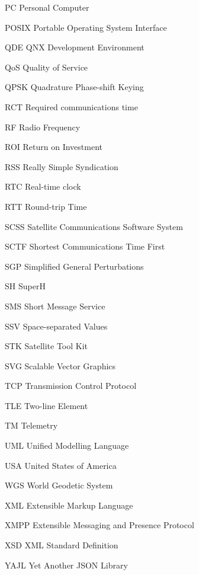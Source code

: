\begin{Nomencl}[\gnat]
		\item[PC]				Personal Computer
		\item[POSIX]			Portable Operating System Interface
		\item[QDE]			QNX Development Environment
		\item[QoS]				Quality of Service
		\item[QPSK]			Quadrature Phase-shift Keying
		\item[RCT]				Required communications time
		\item[RF]				Radio Frequency
		\item[ROI]				Return on Investment
		\item[RSS]			Really Simple Syndication
		\item[RTC]				Real-time clock
		\item[RTT]				Round-trip Time
		\item[SCSS]			Satellite Communications Software System
		\item[SCTF]			Shortest Communications Time First
		\item[SGP]			Simplified General Perturbations
		\item[SH]				SuperH
		\item[SMS]			Short Message Service
		\item[SSV]			Space-separated Values
		\item[STK]				Satellite Tool Kit
		\item[SVG]			Scalable Vector Graphics
		\item[TCP]				Transmission Control Protocol
		\item[TLE]				Two-line Element
		\item[TM]				Telemetry
		\item[UML]			Unified Modelling Language
		\item[USA]			United States of America
		\item[WGS]			World Geodetic System
		\item[XML]				Extensible Markup Language
		\item[XMPP]			Extensible Messaging and Presence Protocol
		\item[XSD]				XML Standard Definition
		\item[YAJL]			Yet Another JSON Library
\end{Nomencl}
\endinput
